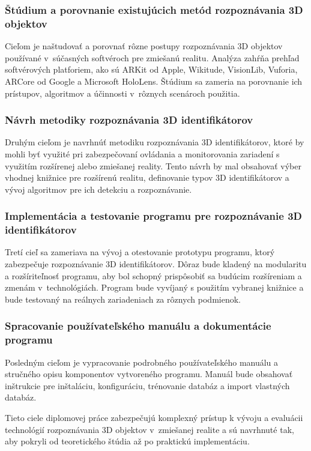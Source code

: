 \subsubsection{Štúdium a porovnanie existujúcich metód rozpoznávania 3D objektov}
Cieľom je naštudovať a porovnať rôzne postupy rozpoznávania 3D objektov používané v~súčasných softvéroch pre zmiešanú realitu. Analýza zahŕňa prehľad softvérových platforiem, ako sú ARKit od Apple, Wikitude, VisionLib, Vuforia, ARCore od Google a Microsoft HoloLens. Štúdium sa zameria na porovnanie ich prístupov, algoritmov a účinnosti v~rôznych scenároch použitia.

\subsubsection{Návrh metodiky rozpoznávania 3D identifikátorov}
Druhým cieľom je navrhnúť metodiku rozpoznávania 3D identifikátorov, ktoré by mohli byť využité pri zabezpečovaní ovládania a monitorovania zariadení s využitím rozšírenej alebo zmiešanej reality. Tento návrh by mal obsahovať výber vhodnej knižnice pre rozšírenú realitu, definovanie typov 3D identifikátorov a vývoj algoritmov pre ich detekciu a rozpoznávanie.

\subsubsection{Implementácia a testovanie programu pre rozpoznávanie 3D identifikátorov}
Tretí cieľ sa zameriava na vývoj a otestovanie prototypu programu, ktorý zabezpečuje rozpoznávanie 3D identifikátorov. Dôraz bude kladený na modularitu a rozšíriteľnosť programu, aby bol schopný prispôsobiť sa budúcim rozšíreniam a zmenám v~technológiách. Program bude vyvíjaný s použitím vybranej knižnice a bude testovaný na reálnych zariadeniach za rôznych podmienok.

\subsubsection{Spracovanie používateľského manuálu a dokumentácie programu}
Posledným cieľom je vypracovanie podrobného používateľského manuálu a stručného opisu komponentov vytvoreného programu. Manuál bude obsahovať inštrukcie pre inštaláciu, konfiguráciu, trénovanie databáz a import vlastných databáz.

Tieto ciele diplomovej práce zabezpečujú komplexný prístup k vývoju a evaluácii technológií rozpoznávania 3D objektov v~zmiešanej realite a sú navrhnuté tak, aby pokryli od teoretického štúdia až po praktickú implementáciu.

